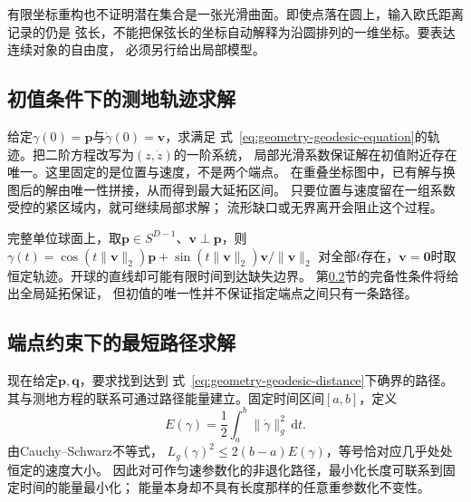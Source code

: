 有限坐标重构也不证明潜在集合是一张光滑曲面。即使点落在圆上，输入欧氏距离记录的仍是
弦长，不能把保弦长的坐标自动解释为沿圆排列的一维坐标。要表达连续对象的自由度，
必须另行给出局部模型。

\subsection{初值条件下的测地轨迹求解}
\label{sec:geometry-geodesic-initial-value}

给定$\gamma(0)=\bm p$与$\dot\gamma(0)=\bm v$，求满足
式~\eqref{eq:geometry-geodesic-equation}的轨迹。把二阶方程改写为$(z,\dot z)$的一阶系统，
局部光滑系数保证解在初值附近存在唯一。这里固定的是位置与速度，不是两个端点。
在重叠坐标图中，已有解与换图后的解由唯一性拼接，从而得到最大延拓区间。
只要位置与速度留在一组系数受控的紧区域内，就可继续局部求解；
流形缺口或无界离开会阻止这个过程。

完整单位球面上，取$\bm p\in S^{D-1}$、$\bm v\perp\bm p$，则
$\gamma(t)=\cos(t\lVert\bm v\rVert_2)\bm p
+\sin(t\lVert\bm v\rVert_2)\bm v/\lVert\bm v\rVert_2$
对全部$t$存在，$\bm v=\bm0$时取恒定轨迹。开球的直线却可能有限时间到达缺失边界。
第\ref{sec:geometry-endpoint-minimizing-path}节的完备性条件将给出全局延拓保证，
但初值的唯一性并不保证指定端点之间只有一条路径。

\subsection{端点约束下的最短路径求解}
\label{sec:geometry-endpoint-minimizing-path}

现在给定$\bm p,\bm q$，要求找到达到
式~\eqref{eq:geometry-geodesic-distance}下确界的路径。
其与测地方程的联系可通过路径能量建立。固定时间区间$[a,b]$，定义
\[
 E(\gamma)=\frac12\int_a^b\lVert\dot\gamma\rVert_g^2\,\mathrm dt.
\]
由Cauchy--Schwarz不等式，
$L_g(\gamma)^2\leq2(b-a)E(\gamma)$，等号恰对应几乎处处恒定的速度大小。
因此对可作匀速参数化的非退化路径，最小化长度可联系到固定时间的能量最小化；
能量本身却不具有长度那样的任意重参数化不变性。

